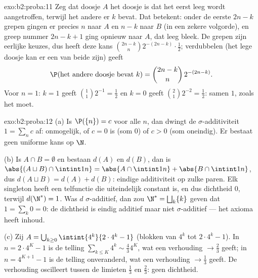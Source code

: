 \begin{solution}{exo:b2:proba:11}
Zeg dat doosje $A$ het doosje is dat het eerst leeg wordt
aangetroffen, terwijl het andere er $k$ bevat. Dat betekent: onder
de eerste $2n - k$ grepen gingen er precies $n$ naar $A$ en $n - k$
naar $B$ (in een zekere volgorde), en greep nummer $2n - k + 1$
ging opnieuw naar $A$, dat leeg bleek. De grepen zijn
 eerlijke keuzes, dus heeft deze  kans
$\binom{2n-k}{n}2^{-(2n-k)}\cdot\frac12$; verdubbelen (het lege
doosje kan er een van beide zijn) geeft
\[
\P(\text{het andere doosje bevat }k) =
\binom{2n-k}{n}\,2^{-(2n-k)} .
\]
Voor $n = 1$: $k = 1$ geeft $\binom11 2^{-1} = \frac12$ en $k = 0$
geeft $\binom21 2^{-2} = \frac12$: samen $1$, zoals het moet.
\end{solution}

\begin{solution}{exo:b2:proba:12}
(a) Is $\P(\{n\}) = c$ voor alle $n$, dan dwingt de
$\sigma$-additiviteit $1 = \sum_nc$ af: onmogelijk, of $c = 0$ is
(som $0$) of $c > 0$ (som oneindig). Er bestaat geen uniforme kans
op $\N$.

(b) Is $A \cap B = \emptyset$ en bestaan $d(A)$ en $d(B)$, dan is
$\abs{(A \sqcup B)\cap\intint1n} = \abs{A\cap\intint1n} +
\abs{B\cap\intint1n}$, dus $d(A \sqcup B) = d(A) + d(B)$: eindige
additiviteit op zulke paren. Elk singleton heeft een telfunctie die
uiteindelijk constant is, en dus dichtheid $0$, terwijl $d(\N^*) =
1$. Was $d$ $\sigma$-additief, dan zou $\N^* = \bigsqcup_k\{k\}$
geven dat $1 = \sum_k 0 = 0$: de dichtheid is eindig additief maar
niet $\sigma$-additief --- het axioma heeft inhoud.

(c) Zij $A = \bigcup_{k\geq0}\intint{4^k}{2\cdot4^k - 1}$ (blokken
van $4^k$ tot $2\cdot4^k - 1$). In $n = 2\cdot4^K - 1$ is de
telling $\sum_{k\leq K}4^k \sim \frac43 4^K$, wat een verhouding
$\to \frac23$ geeft; in $n = 4^{K+1} - 1$ is de telling
onveranderd, wat een verhouding $\to \frac13$ geeft. De verhouding
oscilleert tussen de limieten $\frac13$ en $\frac23$: geen
dichtheid.
\end{solution}

